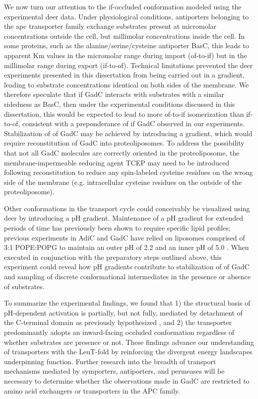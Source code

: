 We now turn our attention to the \gls{if}-occluded conformation modeled using the experimental \gls{deer} data. Under physiological conditions, antiporters belonging to the \gls{apc} transporter family exchange substrates present at micromolar concentrations outside the cell, but millimolar concentrations inside the cell. In some proteins, such as the alanine/serine/cysteine antiporter BasC, this leads to apparent Km values in the micromolar range during import (\gls{of}-to-\gls{if}) but in the millimolar range during export (\gls{if}-to-\gls{of}). Technical limitations prevented the \gls{deer} experiments presented in this dissertation from being carried out in a gradient, leading to substrate concentrations identical on both sides of the membrane. We therefore speculate that if GadC interacts with substrates with a similar sidedness as BasC, then under the experimental conditions discussed in this dissertation, this would be expected to lead to more \gls{of}-to-\gls{if} isomerization than \gls{if}-to-\gls{of}, consistent with a preponderance of \gls{if} GadC observed in our experiments. Stabilization of \gls{of} GadC may be achieved by introducing a gradient, which would require reconstitution of GadC into proteoliposomes.  To address the possibility that not all GadC molecules are correctly oriented in the proteoliposome, the membrane-impermeable reducing agent TCEP may need to be introduced following reconstitution to reduce any spin-labeled cysteine residues on the wrong side of the membrane (e.g. intracellular cysteine residues on the outside of the proteoliposome).

Other conformations in the transport cycle could conceivably be visualized using \gls{deer} by introducing a pH gradient. Maintenance of a pH gradient for extended periods of time has previously been shown to require specific lipid profiles; previous experiments in AdiC and GadC have relied on liposomes comprised of 3:1 POPE:POPG to maintain an outer pH of 2.2 and an inner pH of 5.0 \citep*{Tsai2012, Tsai2013, Tsai2013a}. When executed in conjunction with the preparatory steps outlined above, this experiment could reveal how pH gradients contribute to stabilization of \gls{of} GadC and sampling of discrete conformational intermediates in the presence or absence of substrates.

To summarize the experimental findings, we found that 1) the structural basis of pH-dependent activation is partially, but not fully, mediated by detachment of the C-terminal domain as previously hypothesized \citep*{Ma2012}, and 2) the transporter predominantly adopts an inward-facing occluded conformation regardless of whether substrates are presence or not. These findings advance our understanding of transporters with the LeuT-fold by reinforcing the divergent energy landscapes underpinning function. Further research into the breadth of transport mechanisms mediated by symporters, antiporters, and permeases will be necessary to determine whether the observations made in GadC are restricted to amino acid exchangers or transporters in the APC family.

